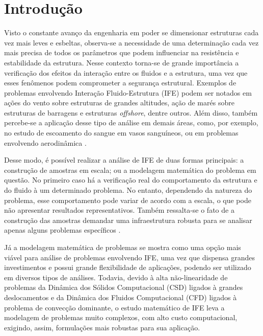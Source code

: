 \documentclass[_ArquivoPrincipal.tex]{subfiles}
\begin{document}
\chapter{Introdução}

Visto o constante avanço da engenharia em poder se dimensionar estruturas cada vez mais leves e esbeltas, observa-se a necessidade de uma determinação cada vez mais precisa de todos os parâmetros que podem influenciar na resistência e estabilidade da estrutura. Nesse contexto torna-se de grande importância a verificação dos efeitos da interação entre os fluidos e a estrutura, uma vez que esses fenômenos podem comprometer a segurança estrutural. Exemplos de problemas envolvendo Interação Fluido-Estrutura (IFE) podem ser notados em ações do vento sobre estruturas de grandes altitudes, ação de marés sobre estruturas de barragens e estruturas \textit{offshore}, dentre outros. Além disso, também percebe-se a aplicação desse tipo de análise em demais áreas, como, por exemplo, no estudo de escoamento do sangue em vasos sanguíneos, ou em problemas envolvendo aerodinâmica \cite{sanches2014fluid, fernandes2020tecnica}.

Desse modo, é possível realizar a análise de IFE de duas formas principais: a construção de amostras em escala; ou a modelagem matemática do problema em questão. No primeiro caso há a verificação real do comportamento da estrutura e do fluido à um determinado problema. No entanto, dependendo da natureza do problema, esse comportamento pode variar de acordo com a escala, o que pode não apresentar resultados representativos. Também ressalta-se o fato de a construção das amostras demandar uma infraestrutura robusta para se analisar apenas alguns problemas específicos \cite{fernandes2020tecnica}.

Já a modelagem matemática de problemas se mostra como uma opção mais viável para análise de problemas envolvendo IFE, uma vez que dispensa grandes investimentos e possui grande flexibilidade de aplicações, podendo ser utilizado em diversos tipos de análises. Todavia, devido à alta não-linearidade de problemas da Dinâmica dos Sólidos Computacional (CSD) ligados à grandes deslocamentos e da Dinâmica dos Fluidos Computacional (CFD) ligados à problema de convecção dominante, o estudo matemático de IFE leva a modelagem de problemas muito complexos, com alto custo computacional, exigindo, assim, formulações mais robustas para sua aplicação.
\end{document}
